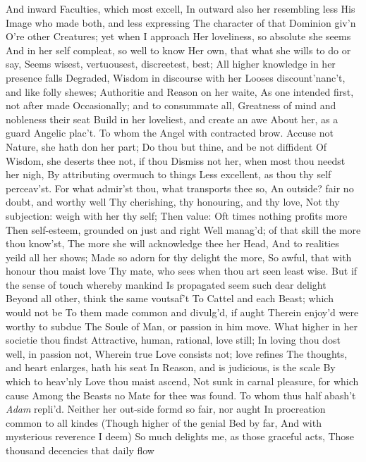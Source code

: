 \documentclass[11pt]{book}
\newcounter {first}
\begin{document}
And inward Faculties, which most excell, 
In outward also her resembling less 
His Image who made both, and less expressing 
The character of that Dominion giv'n 
O're other Creatures; yet when I approach 
Her loveliness, so absolute she seems 
And in her self compleat, so well to know 
Her own, that what she wills to do or say, 
Seems wisest, vertuousest, discreetest, best; 
All higher knowledge in her presence falls 
Degraded, Wisdom in discourse with her 
Looses discount'nanc't, and like folly shewes; 
Authoritie and Reason on her waite, 
As one intended first, not after made 
Occasionally; and to consummate all, 
Greatness of mind and nobleness their seat 
Build in her loveliest, and create an awe 
About her, as a guard Angelic plac't. 
To whom the Angel with contracted brow. 
\quad Accuse not Nature, she hath don her part; 
Do thou but thine, and be not diffident 
Of Wisdom, she deserts thee not, if thou 
Dismiss not her, when most thou needst her nigh, 
By attributing overmuch to things 
Less excellent, as thou thy self perceav'st. 
For what admir'st thou, what transports thee so, 
An outside? fair no doubt, and worthy well 
Thy cherishing, thy honouring, and thy love, 
Not thy subjection: weigh with her thy self; 
Then value: Oft times nothing profits more 
Then self-esteem, grounded on just and right 
Well manag'd; of that skill the more thou know'st, 
The more she will acknowledge thee her Head, 
And to realities yeild all her shows; 
Made so adorn for thy delight the more, 
So awful, that with honour thou maist love 
Thy mate, who sees when thou art seen least wise. 
But if the sense of touch whereby mankind 
Is propagated seem such dear delight 
Beyond all other, think the same voutsaf't 
To Cattel and each Beast; which would not be 
To them made common and divulg'd, if aught 
Therein enjoy'd were worthy to subdue 
The Soule of Man, or passion in him move. 
What higher in her societie thou findst 
Attractive, human, rational, love still; 
In loving thou dost well, in passion not, 
Wherein true Love consists not; love refines 
The thoughts, and heart enlarges, hath his seat 
In Reason, and is judicious, is the scale 
By which to heav'nly Love thou maist ascend, 
Not sunk in carnal pleasure, for which cause 
Among the Beasts no Mate for thee was found. 
\quad To whom thus half abash't \textit{Adam} repli'd. 
Neither her out-side formd so fair, nor aught 
In procreation common to all kindes 
(Though higher of the genial Bed by far, 
And with mysterious reverence I deem) 
So much delights me, as those graceful acts, 
Those thousand decencies that daily flow 
\end{document}
